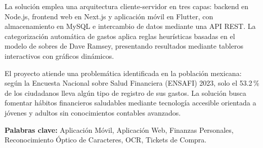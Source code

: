 \begin{titlepage}
La solución emplea una arquitectura cliente-servidor en tres capas: backend en Node.js, frontend web en Next.js y aplicación móvil en Flutter, con almacenamiento en MySQL e intercambio de datos mediante una API REST. La categorización automática de gastos aplica reglas heurísticas basadas en el modelo de sobres de Dave Ramsey, presentando resultados mediante tableros interactivos con gráficos dinámicos.

El proyecto atiende una problemática identificada en la población mexicana: según la Encuesta Nacional sobre Salud Financiera (ENSAFI) 2023, solo el 53.2\,\% de los ciudadanos lleva algún tipo de registro de sus gastos. La solución busca fomentar hábitos financieros saludables mediante tecnología accesible orientada a jóvenes y adultos sin conocimientos contables avanzados.

\vspace{0.4cm}
\noindent\textbf{Palabras clave:} Aplicación Móvil, Aplicación Web, Finanzas Personales, Reconocimiento Óptico de Caracteres, OCR, Tickets de Compra.

\end{titlepage}
